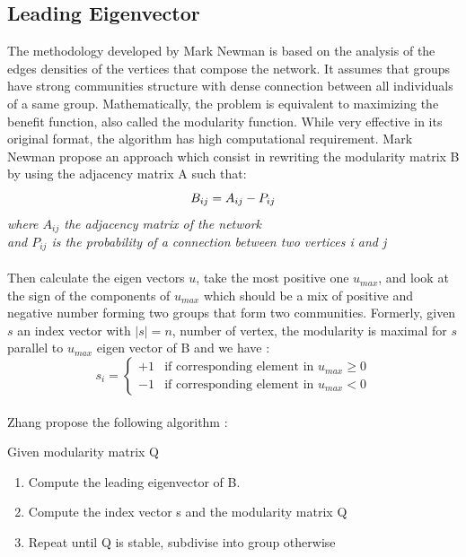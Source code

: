 \documentclass[11pt]{article}       %
\begin{document}
\subsection{Leading Eigenvector}
The methodology developed by Mark Newman \cite{Leading_eigen_vector}  is based on the analysis of the edges densities of the vertices that compose the network. It assumes that groups have strong communities structure with dense connection between all individuals of a same group. Mathematically, the problem is equivalent to maximizing the benefit function, also called the modularity function. While very effective in its original format, the algorithm has high computational requirement. Mark Newman propose an approach which consist in rewriting the modularity matrix B by using the adjacency matrix A such that:
$$
B_{ij} = A_{ij} - P_{ij} \\
$$
\emph {where $A_{ij}$ the adjacency matrix of the network\\and $P_{ij}$ is the probability of a connection between two vertices i and j\\\\}
Then calculate the eigen vectors $u$, take the most positive one $u_{max}$, and look at the sign of the components of $u_{max}$ which should be a mix of positive and negative number forming two groups that form two communities. Formerly, given $s$ an index vector with $\mid s \mid = n$, number of vertex, the modularity is maximal for $s$ parallel to $u_{max}$ eigen vector of B and we have : 
$$
s_{i} = \left\{
    \begin{array}{ll}
        {+1} & \mbox{if corresponding element in } u_{max}  \ge 0 \\
        {-1} & \mbox{if corresponding element in } u_{max}  < 0 
    \end{array}
\right.
$$
\\
Zhang propose the following algorithm \cite{Leading_eigen_vector_community}:
\begin{center}
\fbox
{\parbox{10cm}{
Given modularity matrix Q
\begin{enumerate}
\item Compute the leading eigenvector of B.
\item Compute the index vector s and the modularity matrix Q
\item Repeat until Q is stable, subdivise into group otherwise
\end{enumerate}
}}
\end{center}
\end{document}
